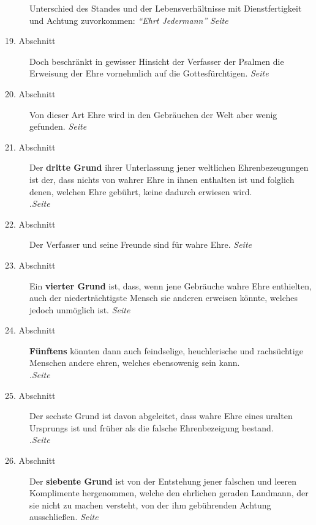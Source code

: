 \begin{description}
Unterschied des Standes und der Lebensverhältnisse mit Dienstfertigkeit und
Achtung zuvorkommen: \textit{"`Ehrt Jedermann"'}
\dotfill \textit{Seite~\pageref{kap9_ab18}}\\
\item[19. Abschnitt] Doch beschränkt in gewisser Hinsicht der Verfasser der
Psalmen die Erweisung der Ehre vornehmlich auf die Gottesfürchtigen.
\dotfill \textit{Seite~\pageref{kap9_ab19}}\\
\item[20. Abschnitt] Von dieser Art Ehre wird in den Gebräuchen der Welt aber
wenig gefunden.
\dotfill \textit{Seite~\pageref{kap9_ab20}}\\
\item[21. Abschnitt] Der \textbf{dritte Grund} ihrer Unterlassung jener
weltlichen Ehrenbezeugungen ist der, dass nichts von wahrer Ehre in ihnen 
enthalten ist und folglich denen, welchen Ehre gebührt, keine dadurch erwiesen 
wird.\\
.\dotfill \textit{Seite~\pageref{kap9_ab21}}\\
\item[22. Abschnitt] Der Verfasser und seine Freunde sind für wahre Ehre.
\dotfill \textit{Seite~\pageref{kap9_ab22}}\\
\item[23. Abschnitt] Ein \textbf{vierter Grund} ist, dass, wenn jene Gebräuche
wahre Ehre
enthielten, auch der niederträchtigste Mensch sie anderen erweisen könnte,
welches jedoch unmöglich ist.
\dotfill \textit{Seite~\pageref{kap9_ab23}}\\
\item[24. Abschnitt] \textbf{Fünftens} könnten dann auch feindselige,
heuchlerische und
rachsüchtige Menschen andere ehren, welches ebensowenig sein kann.\\
.\dotfill \textit{Seite~\pageref{kap9_ab24}}\\
\item[25. Abschnitt] Der sechste Grund ist davon abgeleitet, dass wahre Ehre
eines uralten Ursprungs ist und früher als die falsche Ehrenbezeigung bestand.\\
.\dotfill \textit{Seite~\pageref{kap9_ab25}}\\
\item[26. Abschnitt] Der \textbf{siebente Grund} ist von der Entstehung jener
falschen
und leeren Komplimente hergenommen, welche den ehrlichen geraden Landmann, der
sie nicht zu machen versteht, von der ihm gebührenden Achtung ausschließen.
\dotfill \textit{Seite~\pageref{kap9_ab26}}\\

\end{description}
